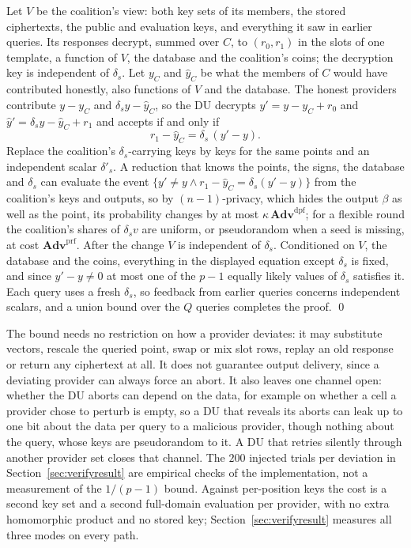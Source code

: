 \documentclass[a4paper,fleqn]{cas-sc}
\newif\ifauthorchecks
\newcommand{\authorcheck}[1]{\ifauthorchecks{\color{red}\textsf{[Authors: #1]}}\fi}
\newcommand{\advPRF}{\mathbf{Adv}^{\mathrm{prf}}}
\newcommand{\advDPF}{\mathbf{Adv}^{\mathrm{dpf}}}
\begin{document}
\begin{pf}
Let $V$ be the coalition's view: both key sets of its members, the stored
ciphertexts, the public and evaluation keys, and everything it saw in earlier
queries. Its responses decrypt, summed over $C$, to $(r_0,r_1)$ in the slots of
one template, a function of $V$, the database and the coalition's coins; the
decryption key is independent of $\delta_s$. Let $y_C$ and $\hat y_C$ be what
the members of $C$ would have contributed honestly, also functions of $V$ and
the database. The honest providers contribute $y-y_C$ and
$\delta_sy-\hat y_C$, so the DU decrypts $y'=y-y_C+r_0$ and
$\hat y'=\delta_sy-\hat y_C+r_1$ and accepts if and only if
\[
r_1-\hat y_C=\delta_s\,(y'-y).
\]
Replace the coalition's $\delta_s$-carrying keys by keys for the same points
and an independent scalar $\delta'_s$. A reduction that knows the points, the
signs, the database and $\delta_s$ can evaluate the event
$\{y'\neq y\wedge r_1-\hat y_C=\delta_s(y'-y)\}$ from the coalition's keys and
outputs, so by $(n{-}1)$-privacy, which hides the output $\beta$ as well as the
point, its probability changes by at most $\kappa\,\advDPF$; for a flexible
round the coalition's shares of $\delta_sv$ are uniform, or pseudorandom when a
seed is missing, at cost $\advPRF$. After the change $V$ is independent of
$\delta_s$. Conditioned on $V$, the database and the coins, everything in the
displayed equation except $\delta_s$ is fixed, and since $y'-y\neq0$ at most one
of the $p-1$ equally likely values of $\delta_s$ satisfies it. Each query uses
a fresh $\delta_s$, so feedback from earlier queries concerns independent
scalars, and a union bound over the $Q$ queries completes the proof. \qed
\end{pf}

The bound needs no restriction on how a provider deviates: it may substitute
vectors, rescale the queried point, swap or mix slot rows, replay an old
response or return any ciphertext at all. It does not guarantee output
delivery, since a deviating provider can always force an abort. It also leaves
one channel open: whether the DU aborts can depend on the data, for example on
whether a cell a provider chose to perturb is empty, so a DU that reveals its
aborts can leak up to one bit about the data per query to a malicious
provider, though nothing about the query, whose keys are pseudorandom to it. A
DU that retries silently through another provider set closes that channel.
The $200$ injected trials per deviation in Section~\ref{sec:verifyresult} are
empirical checks of the implementation, not a measurement of the $1/(p-1)$
bound.\authorcheck{Have the session-check reduction, including the
computational DPF hybrid and adaptive abort leakage, checked by a reader outside
the project.}
Against per-position keys the cost is a second key set and a second full-domain
evaluation per provider, with no extra homomorphic product and no stored key;
Section~\ref{sec:verifyresult} measures all three modes on every path.
\end{document}
